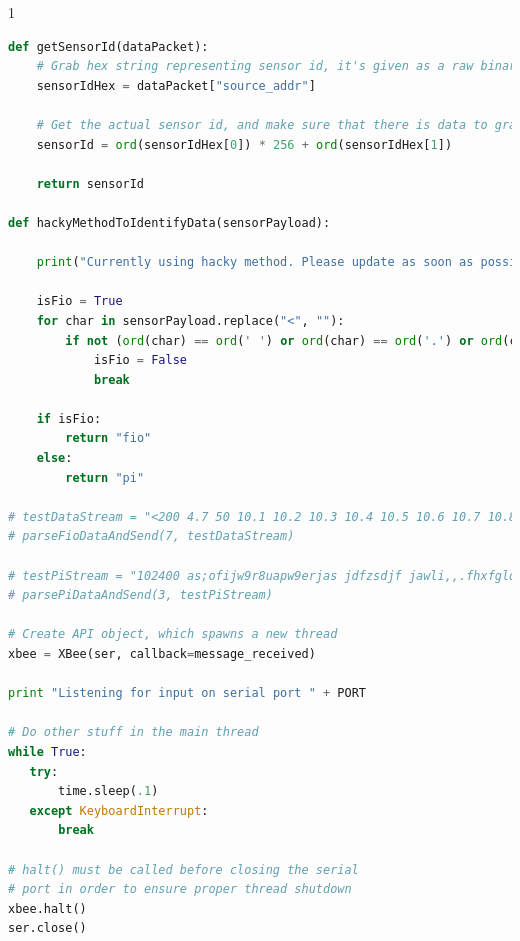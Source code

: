 \documentclass[11pt, oneside, fullpage, doublespace]{article}
\begin{document}
\begin{spacing}{1}
\begin{lstlisting}[language=python]
def getSensorId(dataPacket):
	# Grab hex string representing sensor id, it's given as a raw binary number
	sensorIdHex = dataPacket["source_addr"]

	# Get the actual sensor id, and make sure that there is data to grab
	sensorId = ord(sensorIdHex[0]) * 256 + ord(sensorIdHex[1])

	return sensorId

def hackyMethodToIdentifyData(sensorPayload):

	print("Currently using hacky method. Please update as soon as possible. Let's not be lazy here. Seriously though. FIX IT!")

	isFio = True
	for char in sensorPayload.replace("<", ""):
		if not (ord(char) == ord(' ') or ord(char) == ord('.') or ord(char) == ord('>') or (ord(char) in range(ord('0'), ord('9') + 1))):
			isFio = False
			break

	if isFio:
		return "fio"
	else:
		return "pi"

# testDataStream = "<200 4.7 50 10.1 10.2 10.3 10.4 10.5 10.6 10.7 10.8 10.9>"
# parseFioDataAndSend(7, testDataStream)

# testPiStream = "102400 as;ofijw9r8uapw9erjas jdfzsdjf jawli,,.fhxfglq8uw3498ysf#R$**9hdfsaehrksdf;sfawr68569#$("
# parsePiDataAndSend(3, testPiStream)

# Create API object, which spawns a new thread
xbee = XBee(ser, callback=message_received)

print "Listening for input on serial port " + PORT

# Do other stuff in the main thread
while True:
   try:
       time.sleep(.1)
   except KeyboardInterrupt:
       break

# halt() must be called before closing the serial
# port in order to ensure proper thread shutdown
xbee.halt()
ser.close()

\end{lstlisting}
\end{spacing}
\end{document}
